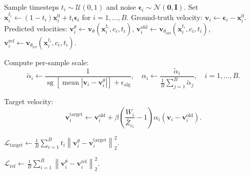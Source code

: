 \documentclass{article} %
\begin{document}
\begin{algorithm}[H]
\begin{algorithmic}[1]
             
                \State Sample timesteps $t_i \sim \mathcal{U}(0,1)$ and noise $\boldsymbol{\epsilon}_i \sim \mathcal{N}(\mathbf{0}, \mathbf{I})$.
                \State Set $\mathbf{x}_i^{t_i} \leftarrow (1 - t_i)\mathbf{x}_i^0 + t_i\boldsymbol{\epsilon}_i$ for $i = 1, \dots, B$.
                \State Ground-truth velocity: $\mathbf{v}_i \leftarrow \boldsymbol{\epsilon}_i - \mathbf{x}_i^0$.
                \State Predicted velocities:
                $\mathbf{v}_i^{\theta} \leftarrow \mathbf{v}_{\theta}(\mathbf{x}_i^{t_i}, c_i, t_i)$,
                $\mathbf{v}_i^{\mathrm{old}} \leftarrow \mathbf{v}_{\theta_{\mathrm{old}}}(\mathbf{x}_i^{t_i}, c_i, t_i)$,
                $\mathbf{v}_i^{\mathrm{ref}} \leftarrow \mathbf{v}_{\theta_{\mathrm{ref}}}(\mathbf{x}_i^{t_i}, c_i, t_i)$.

                \State Compute per-sample scale:
                \[
                    \widetilde{\alpha}_i \leftarrow
                    \frac{1}{
                        \operatorname{sg}\!\left[
                            \operatorname{mean}\left|\mathbf{v}_i - \mathbf{v}_i^{\theta}\right|
                        \right] + \epsilon_{\mathrm{alg}}
                    },
                    \quad
                    \alpha_i \leftarrow
                    \frac{\widetilde{\alpha}_i}{
                        \frac{1}{B}\sum_{j=1}^{B}\widetilde{\alpha}_j
                    },
                    \quad i = 1, \dots, B.
                \]

                \State Target velocity:
                \[
                    \mathbf{v}_i^{\mathrm{target}} \leftarrow
                    \mathbf{v}_i^{\mathrm{old}}
                    +
                    \beta\left(
                        \frac{W_i}{\bar{Z}_{c_i}} - 1
                    \right)
                    \alpha_i\left(
                        \mathbf{v}_i - \mathbf{v}_i^{\mathrm{old}}
                    \right).
                \]

                \State $\mathcal{L}_{\mathrm{target}} \leftarrow
                \frac{1}{B}\sum_{i=1}^{B} t_i
                \left\|\mathbf{v}_i^{\theta} - \mathbf{v}_i^{\mathrm{target}}\right\|_2^2$.

                \State $\mathcal{L}_{\mathrm{ref}} \leftarrow
                \frac{1}{B}\sum_{i=1}^{B}
                \left\|\mathbf{v}_i^{\theta} - \mathbf{v}_i^{\mathrm{ref}}\right\|_2^2$.


\end{algorithmic}
\end{algorithm}
\end{document}
